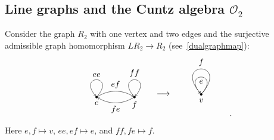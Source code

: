 \documentclass[12pt,times,a4paper]{amsart}
\numberwithin{equation}{section}
\numberwithin{equation}{section}
\begin{document}
\subsection{Line graphs and the Cuntz algebra \boldmath$\mathcal{O}_2$}
\noindent
Consider the graph $R_2$ with one vertex and two edges and the surjective admissible graph homomorphism $LR_2\to R_2$ 
(see~\eqref{dualgraphmap}):
\begin{equation}\label{cuntzfold}
\begin{gathered}
\begin{tikzpicture}[scale=0.4,auto,swap]
\centering
\tikzstyle{vertex}=[circle,fill=black,minimum size=3pt,inner sep=0pt]
\tikzstyle{edge}=[draw,->]
\tikzset{every loop/.style={min distance=20mm,in=130,out=50,looseness=40}}
    \node[vertex,label=below:$e$] (1) at (-2,0) {};
    \node[vertex,label=below:$f$] (2) at (2,0) {};
    \path (1) edge [edge, anchor=center, loop above] node[above] {$ee$} (1);
    \path (2) edge [draw,<-, anchor=center, loop above] node[above] {$ff$} (2);
    \path (1) edge [edge, bend left] node[above] {$ef$} (2);
    \path (2) edge [edge, bend left] node[below] {$fe$} (1);
\end{tikzpicture}
\begin{tikzpicture}[scale=0.4,auto,swap]
\centering
\tikzstyle{vertex}=[circle,fill=black,minimum size=3pt,inner sep=0pt]
\tikzstyle{edge}=[draw,->]
    \node (1) at (0,0) {};
    \node (2) at (0,-1) {$\longrightarrow$};
    \node (3) at (0,-2) {};    
    \node (4) at (0,-3) {};
\end{tikzpicture}
\begin{tikzpicture}[scale=0.4,auto,swap]
\centering
\tikzstyle{vertex}=[circle,fill=black,minimum size=3pt,inner sep=0pt]
\tikzstyle{edge}=[draw,->]
    \node[vertex,label=below:$v$] (1) at (0,0) {};
    \node (2) at (0,-1) {};
    \node (3) at (0,-2) {};
    \path (1) edge [edge, anchor=center, loop above, min distance=20mm, in=130, out=50, looseness=40] node[below] {$e$} (1);
    \path (1) edge [edge, anchor=center, loop below, in=130, out=50, looseness=60] node[above] {$f$} (1);
\end{tikzpicture}.
\end{gathered}
\end{equation}
Here $e,f\mapsto v$, $ee,ef\mapsto e$, and $ff,fe\mapsto f$.
\end{document}
